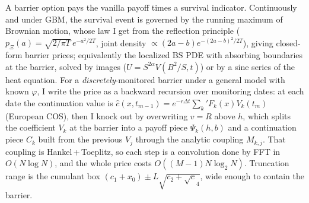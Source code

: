 \documentclass[11pt]{article}
\newcommand{\ch}{\varphi}
\newcommand{\Max}{\Xi}
\begin{document}
A barrier option pays the vanilla payoff times a survival indicator. Continuously and under GBM, the survival
event is governed by the running maximum of Brownian motion, whose law I get from the reflection principle
($p_{\Max}(a)=\sqrt{2/\pi T}\,e^{-a^2/2T}$, joint density $\propto(2a-b)e^{-(2a-b)^2/2T}$), giving closed-form
barrier prices; equivalently the localized BS PDE with absorbing boundaries at the barrier, solved by images
($U=S^{2\alpha}V(B^2/S,t)$) or by a sine series of the heat equation. For a \emph{discretely}-monitored barrier
under a general model with known $\ch$, I write the price as a backward recursion over monitoring dates: at each
date the continuation value is $\hat c(x,t_{m-1})=e^{-r\Delta t}\sum_k{}'F_k(x)V_k(t_m)$ (European COS), then I
knock out by overwriting $v=R$ above $h$, which splits the coefficient $V_k$ at the barrier into a payoff piece
$\Psi_k(h,b)$ and a continuation piece $\hat C_k$ built from the previous $V_j$ through the analytic coupling
$M_{k,j}$. That coupling is Hankel\,+\,Toeplitz, so each step is a convolution done by FFT in $O(N\log N)$, and
the whole price costs $O((M{-}1)N\log_2 N)$. Truncation range is the cumulant box $(c_1+x_0)\pm L\sqrt{c_2+\sqrt
c_4}$, wide enough to contain the barrier.
\end{document}
